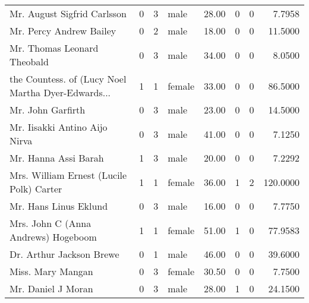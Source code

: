 \begin{tabular}{lrrlrrrr}
Mr. August Sigfrid Carlsson                        &         0 &       3 &    male &  28.00 &                        0 &                        0 &    7.7958 \\
Mr. Percy Andrew Bailey                            &         0 &       2 &    male &  18.00 &                        0 &                        0 &   11.5000 \\
Mr. Thomas Leonard Theobald                        &         0 &       3 &    male &  34.00 &                        0 &                        0 &    8.0500 \\
the Countess. of (Lucy Noel Martha Dyer-Edwards... &         1 &       1 &  female &  33.00 &                        0 &                        0 &   86.5000 \\
Mr. John Garfirth                                  &         0 &       3 &    male &  23.00 &                        0 &                        0 &   14.5000 \\
Mr. Iisakki Antino Aijo Nirva                      &         0 &       3 &    male &  41.00 &                        0 &                        0 &    7.1250 \\
Mr. Hanna Assi Barah                               &         1 &       3 &    male &  20.00 &                        0 &                        0 &    7.2292 \\
Mrs. William Ernest (Lucile Polk) Carter           &         1 &       1 &  female &  36.00 &                        1 &                        2 &  120.0000 \\
Mr. Hans Linus Eklund                              &         0 &       3 &    male &  16.00 &                        0 &                        0 &    7.7750 \\
Mrs. John C (Anna Andrews) Hogeboom                &         1 &       1 &  female &  51.00 &                        1 &                        0 &   77.9583 \\
Dr. Arthur Jackson Brewe                           &         0 &       1 &    male &  46.00 &                        0 &                        0 &   39.6000 \\
Miss. Mary Mangan                                  &         0 &       3 &  female &  30.50 &                        0 &                        0 &    7.7500 \\
Mr. Daniel J Moran                                 &         0 &       3 &    male &  28.00 &                        1 &                        0 &   24.1500 \\

\end{tabular}
